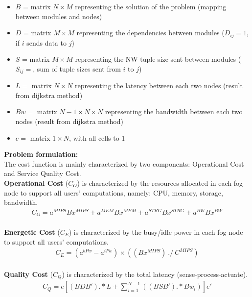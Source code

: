 \documentclass{article}
\begin{document}
\begin{itemize}
	\item $B$ = matrix $N\times M$ representing the solution of the problem (mapping between modules and nodes)
	\item $D$ = matrix $M\times M$ representing the dependencies between modules ($D_{ij}=1$, if $i$ sends data to $j$)
	\item $S$ = matrix $M\times M$ representing the NW tuple size sent between modules ($S_{ij}=$, sum of tuple sizes sent from $i$ to $j$)
	\item $L=$ matrix $N\times N$ representing the latency between each two nodes (result from dijkstra method)
	\item $Bw=$ matrix $N-1 \times N\times N$ representing the bandwidth between each two nodes (result from dijkstra method)
	\item $e=$ matrix $1\times N$, with all cells to 1
\end{itemize}

\pagebreak
\noindent\textbf{Problem formulation:}\\[6pt]
The cost function is mainly characterized by two components: Operational Cost and Service Quality Cost.\\[6pt]

\noindent\textbf{Operational Cost} ($C_O$) is characterized by the resources allocated in each fog node to support all users' computations, namely: CPU, memory, storage, bandwidth.\\[6pt]
\begin{equation*}
\begin{aligned}
	C_O = a^{MIPS} B x^{MIPS} + a^{MEM} B x^{MEM} + a^{STRG} B x^{STRG} + a^{BW} B x^{BW}
\end{aligned}
\end{equation*}\\[6pt]

\noindent\textbf{Energetic Cost} ($C_E$) is characterized by the busy/idle power in each fog node to support all users' computations.\\[6pt]
\begin{equation*}
\begin{aligned}
C_E = (a^{bPw} - a^{iPw}) \times ((B x^{MIPS})~./~C^{MIPS})
\end{aligned}
\end{equation*}\\[6pt]

\noindent\textbf{Quality Cost} ($C_Q$) is characterized by the total latency (sense-process-actuate).\\[6pt]
\begin{equation*}
\begin{aligned}
C_Q = e[(BDB').*L + \sum_{i=1}^{N-1}\left((BSB').*Bw_i\right)]e'
\end{aligned}
\end{equation*}\\[6pt]
\end{document}
